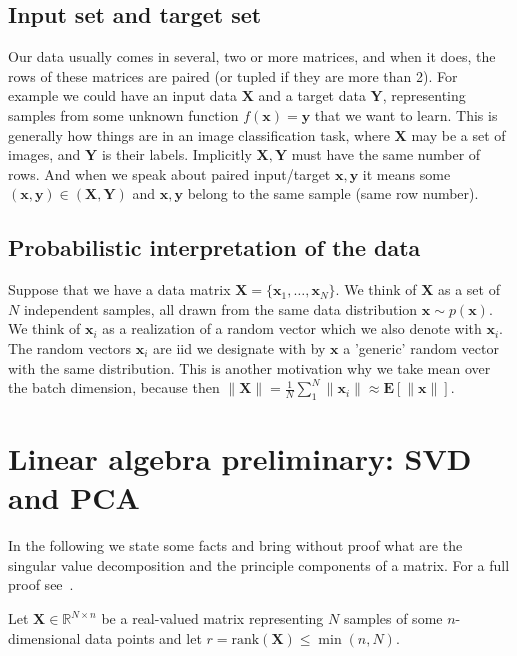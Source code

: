 \documentclass[11pt, a4paper]{report}
\theoremstyle{plain}
\theoremstyle{definition}
\theoremstyle{remark}
\newcommand{\R}{\mathbb{R}}
\newcommand{\E}{\mathbf{E}}
\newcommand{\X}{\mathbf{X}}
\newcommand{\x}{\mathbf{x}}
\newcommand{\Y}{\mathbf{Y}}
\newcommand{\y}{\mathbf{y}}
\newcommand{\bv}[1]{\boldsymbol{#1}}
\begin{document}
\subsection{Input set and target set}
Our data usually comes in several, two or more matrices,
and when it does, the rows of these matrices are paired (or tupled if they are
more than 2).
For example we could have an input data $\X$ and a target data $\Y$, representing 
samples from some unknown function $f(\x) = \y$ that we want to learn. 
This is generally how things are in an image classification task,
where $\X$ may be a set of images, and $\Y$ is
their labels. Implicitly $\X,\Y$ must have the same number of rows. And when we
speak about paired input/target $\x,\y$ it means some $(\x,\y) \in (\X,\Y)$ and
$\x,\y$ belong to the same sample (same row number).



\subsection{Probabilistic interpretation of the data}
Suppose that we have a data matrix $\X = \{\x_1, \dots , \x_N\}$. We think of
$\X$ as a set of $N$ independent samples, all drawn from the same data
distribution $\x \sim p(\x)$. We think of $\x_i$ as a realization of a random
vector which we also denote with $\x_i$. The random vectors $\x_i$ are
iid we designate with by $\x$ a 'generic' random vector with the same
distribution. This is another motivation why
we take mean over the batch dimension, because then $\|\X\| = \frac{1}{N}
\sum_1^N \|\x_i\| \approx \E [\|\x\|]$.


\section{Linear algebra preliminary: SVD and PCA}
In the following we state some facts and bring without proof what are the singular
value decomposition and the principle components of a matrix. For a full proof
see~\cite{serre2001matrices}.

Let $\bv{X} \in \R^{N \times n}$ be a real-valued matrix representing $N$
samples of some $n$-dimensional data points and let $r= \text{rank}(\bv{X}) \leq
\min(n,N)$. 
\end{document}
